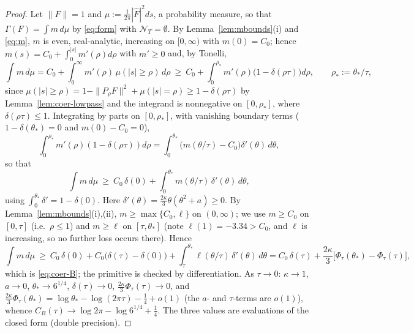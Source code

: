 \documentclass[11pt]{amsart}
\theoremstyle{definition}
\theoremstyle{remark}
\newcommand{\Fh}{\widehat F}
\newcommand{\NT}{\mathcal N_T}
\begin{document}
\begin{proof}
Let $\|F\|=1$ and $\mu:=\frac1{2\pi}|\Fh|^2ds$, a probability measure, so that $\Gamma(F)=\int m\,d\mu$ by
\eqref{eq:form} with $\NT=\emptyset$. By Lemma~\ref{lem:mbounds}(i) and \eqref{eq:m}, $m$ is even, real-analytic,
increasing on $[0,\infty)$ with $m(0)=C_0$; hence $m(s)=C_0+\int_0^{|s|}m'(\rho)d\rho$ with $m'\ge0$ and, by Tonelli,
\[
\int m\,d\mu=C_0+\int_0^\infty m'(\rho)\,\mu(|s|\ge\rho)\,d\rho\ \ge\ C_0+\int_0^{\rho_*}m'(\rho)\big(1-\delta(\rho\tau)\big)d\rho,
\qquad\rho_*:=\theta_*/\tau,
\]
since $\mu(|s|\ge\rho)=1-\|P_{\rho}F\|^2+\mu(|s|=\rho)\ge1-\delta(\rho\tau)$ by Lemma~\ref{lem:coer-lowpass} and the
integrand is nonnegative on $[0,\rho_*]$, where $\delta(\rho\tau)\le1$. Integrating by parts on $[0,\rho_*]$, with
vanishing boundary terms ($1-\delta(\theta_*)=0$ and $m(0)-C_0=0$),
\[
\int_0^{\rho_*}m'(\rho)(1-\delta(\rho\tau))d\rho=\int_0^{\theta_*}\big(m(\theta/\tau)-C_0\big)\delta'(\theta)\,d\theta,
\]
so that
\[
\int m\,d\mu\ \ge\ C_0\,\delta(0)+\int_0^{\theta_*}m(\theta/\tau)\,\delta'(\theta)\,d\theta ,
\]
using $\int_0^{\theta_*}\delta'=1-\delta(0)$. Here $\delta'(\theta)=\frac{2\kappa}3\theta(\theta^2+a)\ge0$. By
Lemma~\ref{lem:mbounds}(i),(ii), $m\ge\max\{C_0,\ell\}$ on $(0,\infty)$; we use $m\ge C_0$ on $[0,\tau]$ (i.e.\ $\rho\le1$)
and $m\ge\ell$ on $[\tau,\theta_*]$ (note $\ell(1)=-3.34>C_0$, and $\ell$ is increasing, so no further loss occurs
there). Hence
\[
\int m\,d\mu\ \ge\ C_0\,\delta(0)+C_0\big(\delta(\tau)-\delta(0)\big)+\int_\tau^{\theta_*}\ell(\theta/\tau)\,\delta'(\theta)\,d\theta
=C_0\,\delta(\tau)+\frac{2\kappa}3\big[\Phi_\tau(\theta_*)-\Phi_\tau(\tau)\big],
\]
which is \eqref{eq:coer-B}; the primitive is checked by differentiation. As $\tau\to0$: $\kappa\to1$, $a\to0$,
$\theta_*\to6^{1/4}$, $\delta(\tau)\to0$, $\frac{2\kappa}3\Phi_\tau(\tau)\to0$, and
$\frac{2\kappa}3\Phi_\tau(\theta_*)=\log\theta_*-\log(2\pi\tau)-\frac14+o(1)$ (the $a$- and $\tau$-terms are $o(1)$),
whence $C_B(\tau)\to\log2\pi-\log6^{1/4}+\frac14$. The three values are evaluations of the closed form (double precision).
\end{proof}
\end{document}
